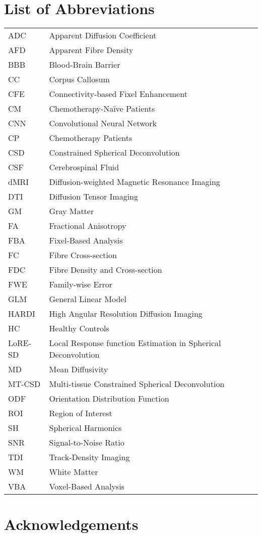 \documentclass{Configuration_Files/PoliMi3i_thesis}
\begin{document}
\chapter*{List of Abbreviations} %
\begin{table}[H]
    \centering
    \begin{tabular}{ll}
        ADC & Apparent Diffusion Coefficient\\
    AFD & Apparent Fibre Density\\
    BBB   & Blood-Brain Barrier \\
    CC & Corpus Callosum\\
    CFE & Connectivity-based Fixel Enhancement\\
    CM & Chemotherapy-Na\"ive Patients\\
    CNN & Convolutional Neural Network\\
    CP & Chemotherapy Patients\\
    CSD & Constrained Spherical Deconvolution\\
    CSF & Cerebrospinal Fluid\\
    dMRI   & Diffusion-weighted Magnetic Resonance Imaging \\
    DTI & Diffusion Tensor Imaging\\
    GM & Gray Matter \\
    FA & Fractional Anisotropy\\
    FBA & Fixel-Based Analysis\\
    FC & Fibre Cross-section\\
    FDC & Fibre Density and Cross-section\\
    FWE & Family-wise Error\\
    GLM & General Linear Model\\
    HARDI & High Angular Resolution Diffusion Imaging\\
    HC & Healthy Controls\\
    LoRE-SD & Local Response function Estimation in Spherical Deconvolution\\
    MD & Mean Diffusivity\\
   MT-CSD & Multi-tissue Constrained Spherical Deconvolution\\
   ODF & Orientation Distribution Function\\
   ROI & Region of Interest\\
   SH & Spherical Harmonics\\
   SNR & Signal-to-Noise Ratio\\
   TDI & Track-Density Imaging\\
      WM  & White Matter \\
      VBA & Voxel-Based Analysis
    \end{tabular}
\end{table}

\chapter*{Acknowledgements}


\cleardoublepage
\end{document}
